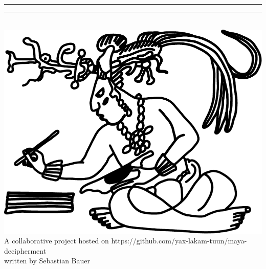 \documentclass[../main.tex]{subfiles}
\begin{document}
\begin{center}
	\noindent\rule[1ex]{\textwidth}{1pt}
	\Large{\textsf{\worktitle}}
	\noindent\rule[1ex]{\textwidth}{1pt}
	\vspace{2em}	
	\\
	\includegraphics[keepaspectratio]{img/scribe}
	\\
	A collaborative project hosted on
	https://github.com/yax-lakam-tuun/maya-decipherment\\
	written by Sebastian Bauer
	\vspace{2em}
	\\
\end{center}
\begin{flushright}
	\documentversionlongcount \documentversiontzolkin \documentversionhaab
	\\
	\documentversiongregoriandate{}
\end{flushright}

\clearpage 
\thispagestyle{empty}
\section*{}

\end{document}
